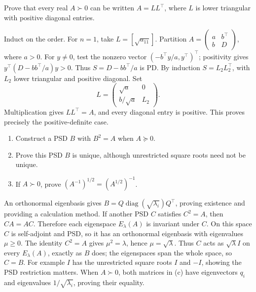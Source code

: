 \begin{problem}\label{ex:09:cholesky}
Prove that every real \(A\succ0\) can be written \(A=LL^\top\), where
\(L\) is lower triangular with positive diagonal entries.
\end{problem}
\begin{solution}
Induct on the order. For \(n=1\), take \(L=[\sqrt{a_{11}}]\).
Partition
\(A=\begin{pmatrix}a&b^\top\\b&D\end{pmatrix}\), where \(a>0\).
For \(y\ne0\), test the nonzero vector
\((-b^\top y/a,y^\top)^\top\); positivity gives
\(y^\top(D-bb^\top/a)y>0\).
Thus \(S=D-bb^\top/a\) is PD.
By induction \(S=L_2L_2^\top\), with \(L_2\) lower triangular and
positive diagonal. Set
\[
 L=\begin{pmatrix}\sqrt a&0\\b/\sqrt a&L_2\end{pmatrix}.
\]
Multiplication gives \(LL^\top=A\), and every diagonal entry is positive.
This proves precisely the positive-definite case.
\end{solution}

\begin{problem}\label{ex:09:square-root}
\begin{enumerate}
\item Construct a PSD \(B\) with \(B^2=A\) when \(A\succeq0\).
\item Prove this PSD \(B\) is unique, although unrestricted square roots
need not be unique.
\item If \(A\succ0\), prove
\((A^{-1})^{1/2}=(A^{1/2})^{-1}\).
\end{enumerate}
\end{problem}
\begin{solution}
An orthonormal eigenbasis gives
\(B=Q\operatorname{diag}(\sqrt{\lambda_i})Q^\top\), proving existence
and providing a calculation method.
If another PSD \(C\) satisfies \(C^2=A\), then \(CA=AC\).
Therefore each eigenspace \(E_\lambda(A)\) is invariant under \(C\).
On this space \(C\) is self-adjoint and PSD, so it has an orthonormal
eigenbasis with eigenvalues \(\mu\geqslant0\).
The identity \(C^2=A\) gives \(\mu^2=\lambda\), hence
\(\mu=\sqrt\lambda\).
Thus \(C\) acts as \(\sqrt\lambda I\) on every \(E_\lambda(A)\), exactly
as \(B\) does; the eigenspaces span the whole space, so \(C=B\).
For example \(I\) has the unrestricted square roots \(I\) and \(-I\),
showing the PSD restriction matters.
When \(A\succ0\), both matrices in (c) have eigenvectors \(q_i\)
and eigenvalues \(1/\sqrt{\lambda_i}\), proving their equality.
\end{solution}


